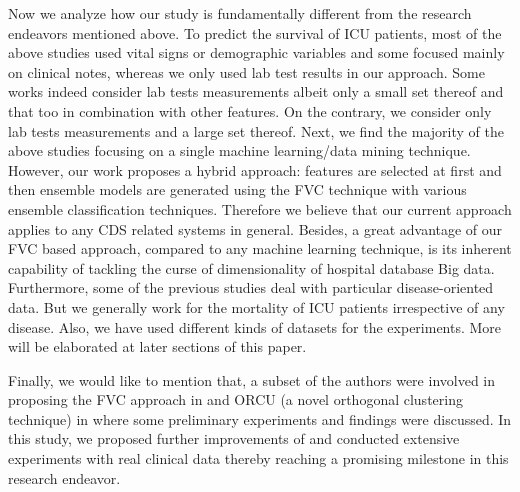 Now we analyze how our study is fundamentally different from the research endeavors mentioned above. To predict the survival of ICU patients, most of the above studies used vital signs or demographic variables and some focused mainly on clinical notes, whereas we only used lab test results in our approach. Some works indeed consider lab tests measurements albeit only a small set thereof and that too in combination with other features. On the contrary, we consider only lab tests measurements and a large set thereof. Next, we find the majority of the above studies focusing on a single machine learning/data mining technique. However, our work proposes a hybrid approach: features are selected at first and then ensemble models are generated using the FVC technique with various ensemble classification techniques. Therefore we believe that our current approach applies to any CDS related systems in general. Besides, a great advantage of our FVC based approach, compared to any machine learning technique, is its inherent capability of tackling the curse of dimensionality\cite{Meyer2018} of hospital database Big data. Furthermore, some of the previous studies deal with particular disease-oriented data. But we generally work for the mortality of ICU patients irrespective of any disease. Also, we have used different kinds of datasets for the experiments. More will be elaborated at later sections of this paper.



Finally, we would like to mention that, a subset of the authors were involved in proposing the FVC approach in \cite{mehedy-masud:2017:fvc} and ORCU (a novel orthogonal clustering technique) in \cite{mehedy-masud:2018:frmwrk} where some preliminary experiments and findings were discussed. In this study, we proposed further improvements of \cite{mehedy-masud:2017:fvc,mehedy-masud:2018:frmwrk} and conducted extensive experiments with real clinical data thereby reaching a promising milestone in this research endeavor.